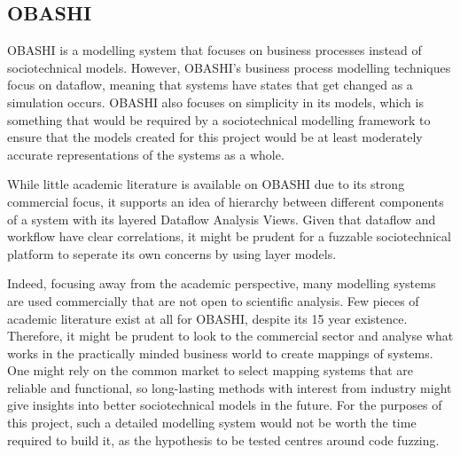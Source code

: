 \subsection{OBASHI}
OBASHI\cite{ObashiMethodology} is a modelling system that focuses on business processes instead of sociotechnical models. However, OBASHI's business process modelling techniques focus on dataflow, meaning that systems have states that get changed as a simulation occurs. OBASHI also focuses on simplicity in its models, which is something that would be required by a sociotechnical modelling framework to ensure that the models created for this project would be at least moderately accurate representations of the systems as a whole.\par
While little academic literature is available on OBASHI due to its strong commercial focus, it supports an idea of hierarchy between different components of a system with its layered Dataflow Analysis Views\cite{ObashiMethodology}. Given that dataflow and workflow have clear correlations, it might be prudent for a fuzzable sociotechnical platform to seperate its own concerns by using layer models. \par 
Indeed, focusing away from the academic perspective, many modelling systems are used commercially that are not open to scientific analysis. Few pieces of academic literature exist at all for OBASHI, despite its 15 year existence. Therefore, it might be prudent to look to the commercial sector and analyse what works in the practically minded business world to create mappings of systems. One might rely on the common market to select mapping systems that are reliable and functional, so long-lasting methods with interest from industry might give insights into better sociotechnical models in the future. For the purposes of this project, such a detailed modelling system would not be worth the time required to build it, as the hypothesis to be tested centres around code fuzzing. \par

